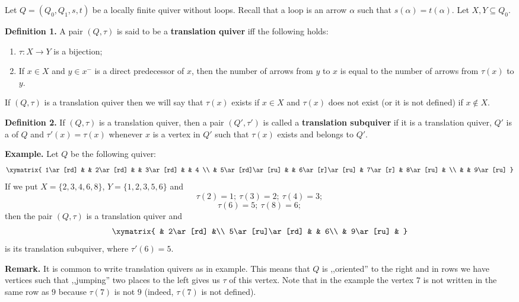 \documentclass[12pt]{article}
\begin{document}
Let $Q=(Q_0,Q_1,s,t)$ be a locally finite quiver without loops. Recall that a loop is an arrow $\alpha$ such that $s(\alpha)=t(\alpha)$. Let $X,Y\subseteq Q_0$.

\textbf{Definition 1.} A pair $(Q,\tau)$ is said to be a \textbf{translation quiver} iff the following holds:
\begin{enumerate}
\item $\tau:X\to Y$ is a bijection;
\item If $x\in X$ and $y\in x^{-}$ is a direct predecessor of $x$, then the number of arrows from $y$ to $x$ is equal to the number of arrows from $\tau(x)$ to $y$.
\end{enumerate}

If $(Q,\tau)$ is a translation quiver then we will say that $\tau(x)$ exists if $x\in X$ and $\tau(x)$ does not exist (or it is not defined) if $x\not\in X$.

\textbf{Definition 2.} If $(Q,\tau)$ is a translation quiver, then a pair $(Q',\tau')$ is called a \textbf{translation subquiver} if it is a translation quiver, $Q'$ is a  of $Q$ and $\tau'(x)=\tau(x)$ whenever $x$ is a vertex in $Q'$ such that $\tau(x)$ exists and belongs to $Q'$.

\textbf{Example.} Let $Q$ be the following quiver:
$$\xymatrix{
1\ar[rd] &   & 2\ar[rd] &   & 3\ar[rd] &   & 4 \\
  & 5\ar[rd]\ar[ru] &   & 6\ar[r]\ar[ru] & 7\ar[r] & 8\ar[ru] &   \\
  &   & 9\ar[ru]
}$$
If we put $X=\{2,3,4,6,8\}$, $Y=\{1,2,3,5,6\}$ and 
$$\tau(2)=1;\ \tau(3)=2;\ \tau(4)=3;$$
$$\tau(6)=5;\ \tau(8)=6;$$
then the pair $(Q,\tau)$ is a translation quiver and 
$$\xymatrix{
& 2\ar[rd] &\\
5\ar[ru]\ar[rd] & & 6\\
& 9\ar[ru] &
}$$
is its translation subquiver, where $\tau'(6)=5$.

\textbf{Remark.} It is common to write translation quivers as in example. This means that $Q$ is ,,oriented'' to the right and in rows we have vertices such that ,,jumping'' two places to the left gives us $\tau$ of this vertex. Note that in the example the vertex $7$ is not written in the same row as $9$ because $\tau(7)$ is not $9$ (indeed, $\tau(7)$ is not defined).
\end{document}
